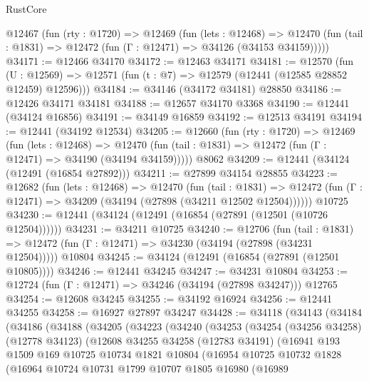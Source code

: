 \begin{lexlean}{RustCore}
\begin{coremodule}
  @12467
    (fun (rty : @1720) =>
    @12469
      (fun (lets : @12468) =>
      @12470 (fun (tail : @1831) => @12472 (fun (Γ : @12471) => @34126 (@34153 @34159)))))
@34171 := @12466 @34170
@34172 := @12463 @34171
@34181 := @12570
    (fun (U : @12569) => @12571 (fun (t : @7) => @12579 (@12441 (@12585 @28852 @12459) @12596)))
@34184 := @34146 (@34172 @34181) @28850
@34186 := @12426 @34171 @34181
@34188 := @12657 @34170 @3368
@34190 := @12441 (@34124 @16856)
@34191 := @34149 @16859
@34192 := @12513 @34191
@34194 := @12441 (@34192 @12534)
@34205 := @12660
    (fun (rty : @1720) =>
    @12469
      (fun (lets : @12468) =>
      @12470 (fun (tail : @1831) => @12472 (fun (Γ : @12471) => @34190 (@34194 @34159)))))
    @8062
@34209 := @12441 (@34124 (@12491 (@16854 @27892)))
@34211 := @27899 @34154 @28855
@34223 := @12682
    (fun (lets : @12468) =>
    @12470
      (fun (tail : @1831) =>
      @12472 (fun (Γ : @12471) => @34209 (@34194 (@27898 (@34211 @12502 @12504))))))
    @10725
@34230 := @12441 (@34124 (@12491 (@16854 (@27891 (@12501 (@10726 @12504))))))
@34231 := @34211 @10725
@34240 := @12706
    (fun (tail : @1831) => @12472 (fun (Γ : @12471) => @34230 (@34194 (@27898 (@34231 @12504)))))
    @10804
@34245 := @34124 (@12491 (@16854 (@27891 (@12501 @10805))))
@34246 := @12441 @34245
@34247 := @34231 @10804
@34253 := @12724 (fun (Γ : @12471) => @34246 (@34194 (@27898 @34247))) @12765
@34254 := @12608 @34245
@34255 := @34192 @16924
@34256 := @12441 @34255
@34258 := @16927 @27897 @34247
@34428 := @34118
    (@34143
      (@34184
        (@34186
          (@34188
            (@34205
              (@34223
                (@34240
                  (@34253
                    (@34254
                      (@34256 @34258)
                      (@12778 @34123)
                      (@12608
                        @34255
                        @34258
                        (@12783 @34191)
                        (@16941
                          @193
                          @1509
                          @169
                          @10725
                          @10734
                          @1821
                          @10804
                          (@16954
                            @10725
                            @10732
                            @1828
                            (@16964
                              @10724
                              @10731
                              @1799
                              @10707
                              @1805
                              @16980
                              (@16989

\end{coremodule}
\end{lexlean}
